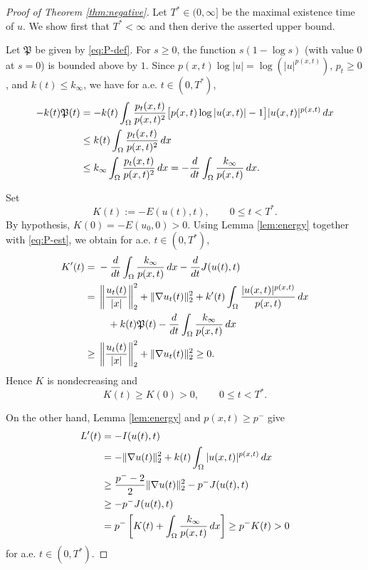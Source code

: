 \documentclass[12pt,reqno]{amsart}
\theoremstyle{definition}
\theoremstyle{remark}
\numberwithin{equation}{section}
\begin{document}
\begin{proof}[Proof of Theorem \ref{thm:negative}]
	Let $T^*\in(0,\infty]$ be the maximal existence time of $u$.
	We show first that $T^*<\infty$ and then derive the asserted upper bound.

	Let $\mathfrak{P}$ be given by \eqref{eq:P-def}. For $s\ge0$, the function $s(1-\log s)$ (with value $0$ at $s=0$) is bounded above by $1$. Since
	$p(x,t)\log|u|=\log(|u|^{p(x,t)})$, $p_t\ge0$, and $k(t)\le k_\infty$, we have for a.e. $t\in(0,T^*)$,
	\begin{align}
	-k(t)\mathfrak{P}(t)
	&=-k(t)\int_\Omega \frac{p_t(x,t)}{p(x,t)^2}
	\big[p(x,t)\log|u(x,t)|-1\big]|u(x,t)|^{p(x,t)}\,dx \notag\\
	&\le k(t)\int_\Omega \frac{p_t(x,t)}{p(x,t)^2}\,dx \notag\\
	&\le k_\infty\int_\Omega \frac{p_t(x,t)}{p(x,t)^2}\,dx
	=-\frac{d}{dt}\int_\Omega \frac{k_\infty}{p(x,t)}\,dx.
	\label{eq:P-est}
	\end{align}

	Set
	\[
	K(t):=-E(u(t),t),\qquad 0\le t<T^*.
	\]
	By hypothesis, $K(0)=-E(u_0,0)>0$.
	Using Lemma \ref{lem:energy} together with \eqref{eq:P-est}, we obtain for a.e. $t\in(0,T^*)$,
	\begin{align}
	K'(t)
	={}&-\frac{d}{dt}\int_\Omega\frac{k_\infty}{p(x,t)}\,dx
	-\frac{d}{dt}J(u(t),t) \notag\\
	={}&\left\|\frac{u_t(t)}{|x|}\right\|_2^2
	+\|\nabla u_t(t)\|_2^2
	+k'(t)\int_\Omega\frac{|u(x,t)|^{p(x,t)}}{p(x,t)}\,dx \notag\\
	&\quad +k(t)\mathfrak{P}(t)
	-\frac{d}{dt}\int_\Omega\frac{k_\infty}{p(x,t)}\,dx \notag\\
	\ge{}&\left\|\frac{u_t(t)}{|x|}\right\|_2^2
	+\|\nabla u_t(t)\|_2^2\ge0.
	\label{eq:K-derivative}
	\end{align}
	Hence $K$ is nondecreasing and
	\[
	K(t)\ge K(0)>0,
	\qquad 0\le t<T^*.
	\]

	On the other hand, Lemma \ref{lem:energy} and $p(x,t)\ge p^-$ give
	\begin{align}
	L'(t)
	&=-I(u(t),t) \notag\\
	&=-\|\nabla u(t)\|_2^2
	+k(t)\int_\Omega |u(x,t)|^{p(x,t)}\,dx \notag\\
	&\ge \frac{p^- -2}{2}\|\nabla u(t)\|_2^2-p^-J(u(t),t) \notag\\
	&\ge -p^-J(u(t),t) \notag\\
	&=p^-\left[K(t)+\int_\Omega\frac{k_\infty}{p(x,t)}\,dx\right]
	\ge p^-K(t)>0
	\label{eq:L-prime-negative}
	\end{align}
	for a.e. $t\in(0,T^*)$.


\end{proof}
\end{document}
